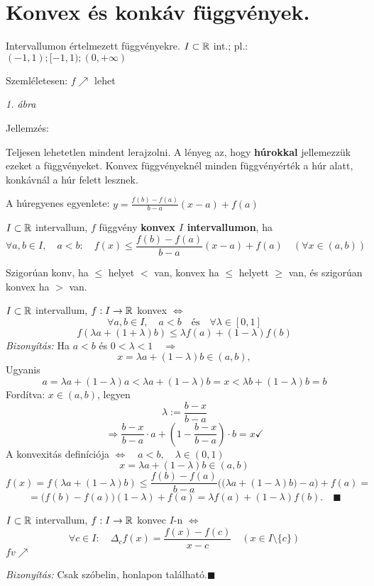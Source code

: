 \documentclass[a4paper,11.5pt]{article}
\begin{document}
	\section{Konvex és konkáv függvények.}
	\begin{note}
		Intervallumon értelmezett függvényekre. $I\subset \mathbb{R}$ int.; pl.: $(-1,1); [-1,1); (0,+\infty)$
	\end{note}
	Szemléletesen: $f\nearrow$ lehet 
	\begin{center}
		\textit{1. ábra}
	\end{center}
	Jellemzés: 
	\begin{note}
		Teljesen lehetetlen mindent lerajzolni. A lényeg az, hogy \textbf{húrokkal} jellemezzük ezeket a függvényeket. Konvex függvényeknél minden függvényérték a húr alatt, konkávnál a húr felett lesznek.
	\end{note}
	A húregyenes egyenlete: $\displaystyle y=\frac{f(b)-f(a)}{b-a}(x-a)+f(a)$
	\begin{definition}
		$I\subset\mathbb{R}$ intervallum, $f$ függvény \textbf{konvex $I$ intervallumon}, ha 
		\[ \forall a,b\in I,\quad a<b:\quad  f(x)\leq\frac{f(b)-f(a)}{b-a}(x-a)+f(a)\quad (\forall x\in(a,b)) \]
	\end{definition}
	\begin{note}
		Szigorúan konv, ha $\leq$ helyet $<$ van, konvex ha $\leq$ helyett $\geq$ van, és szigorúan konvex ha $>$ van.
	\end{note}
	\begin{theorem}
		$I\subset\mathbb{R}$ intervallum, $f:I\to\mathbb{R}$ konvex $\Leftrightarrow$
		\[ \forall a,b\in I,\quad a<b\quad \text{és}\quad \forall\lambda\in[0,1] \]
		\[ f(\lambda a+(1+\lambda)b)\leq\lambda f(a)+(1-\lambda)f(b) \]
		\textit{Bizonyítás:}
		Ha $a<b$ és $0<\lambda<1\quad \Rightarrow$
		\[ x=\lambda a+(1-\lambda)b\in(a,b), \]
		Ugyanis
		\[ a= \lambda a+(1-\lambda)a<\lambda a+(1-\lambda)b=x<\lambda b+(1-\lambda)b=b \]
		Fordítva: $x\in(a,b)$, legyen
		\[ \lambda:=\frac{b-x}{b-a} \]
		\[ \Rightarrow \frac{b-x}{b-a}\cdot a+\left(1-\frac{b-x}{b-a}\right)\cdot b=x\checkmark \]
		A konvexitás definíciója $\Leftrightarrow\quad a<b,\quad \lambda\in(0,1)$
		\[ x=\lambda a+(1-\lambda)b\in(a,b) \]
		\[ f(x)=f(\lambda a+(1-\lambda)b)\leq \frac{f(b)-f(a)}{b-a}\Big(\big(\lambda a+(1-\lambda)b\big)-a\Big)+f(a)= \]
		\[ =\big(f(b)-f(a)\big)(1-\lambda)+f(a)=\lambda f(a)+(1-\lambda)f(b).\quad \blacksquare \]
	\end{theorem}
	\begin{theorem}
		$I\subset \mathbb{R}$ intervallum, $f:I\to\mathbb{R}$ konvec $I$-n $\Leftrightarrow$
		\[ \forall c\in I:\quad \varDelta_c f(x)=\frac{f(x)-f(c)}{x-c}\quad (x\in I\setminus\{c\}) \]
		$fv\nearrow$
		
		\textit{Bizonyítás:} Csak szóbelin, honlapon található.\quad $\blacksquare$
	\end{theorem}
\end{document}
